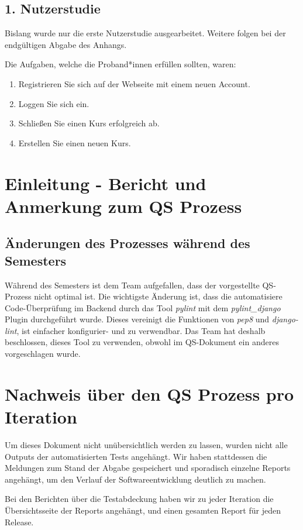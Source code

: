 \documentclass[accentcolor=tud0b,12pt,paper=a4]{tudreport}
\begin{document}
\section{1. Nutzerstudie}
Bislang wurde nur die erste Nutzerstudie ausgearbeitet. Weitere folgen bei der endgültigen Abgabe des Anhangs.

Die Aufgaben, welche die Proband*innen erfüllen sollten, waren:
\begin{enumerate}
	\item Registrieren Sie sich auf der Webseite mit einem neuen Account.
	\item Loggen Sie sich ein.
	\item Schließen Sie einen Kurs erfolgreich ab.
	\item Erstellen Sie einen neuen Kurs.
\end{enumerate}
	


\chapter{Einleitung - Bericht und Anmerkung zum QS Prozess}
\section{Änderungen des Prozesses während des Semesters}
Während des Semesters ist dem Team aufgefallen, dass der vorgestellte QS-Prozess nicht optimal ist. Die wichtigste Änderung ist, dass die automatisiere Code-Überprüfung im Backend durch das Tool \emph{pylint} mit dem \emph{pylint\_django} Plugin durchgeführt wurde. Dieses vereinigt die Funktionen von \emph{pep8} und \emph{django-lint}, ist einfacher konfigurier- und zu verwendbar. Das Team hat deshalb beschlossen, dieses Tool zu verwenden, obwohl im QS-Dokument ein anderes vorgeschlagen wurde.

\chapter{Nachweis über den QS Prozess pro Iteration}
Um dieses Dokument nicht unübersichtlich werden zu lassen, wurden nicht alle Outputs der automatisierten Tests angehängt. Wir haben stattdessen die Meldungen zum Stand der Abgabe gespeichert und sporadisch einzelne Reports angehängt, um den Verlauf der Softwareentwicklung deutlich zu machen.

Bei den Berichten über die Testabdeckung haben wir zu jeder Iteration die Übersichtsseite der Reports angehängt, und einen gesamten Report für jeden Release.
\end{document}
